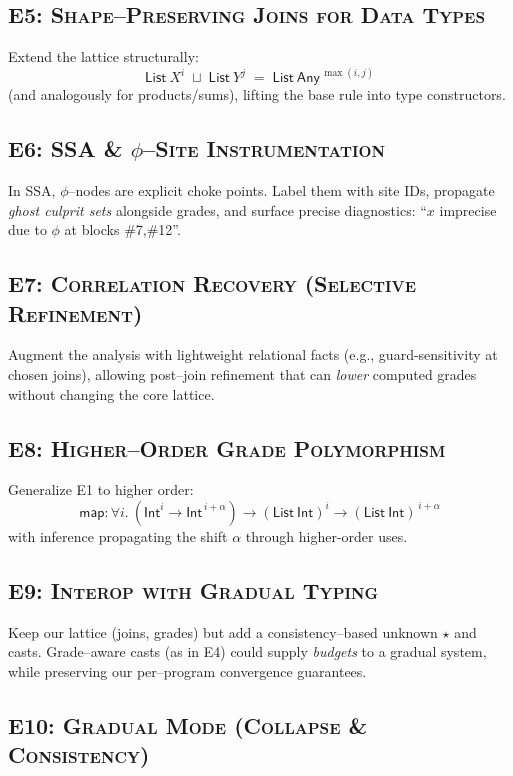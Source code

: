 \subsection{\textsc{E5: Shape–Preserving Joins for Data Types}}
Extend the lattice structurally:
\[
\textsf{List}\ X^{i} \;\sqcup\; \textsf{List}\ Y^{j}
\;=\; \textsf{List}\ \textsf{Any}^{\,\max(i,j)}
\]
(and analogously for products/sums), lifting the base rule into type constructors.

\subsection{\textsc{E6: SSA \& \texorpdfstring{$\phi$}{phi}–Site Instrumentation}}
In SSA, $\phi$–nodes are explicit choke points.
Label them with site IDs, propagate \emph{ghost culprit sets} alongside grades, and surface precise diagnostics:
“$x$ imprecise due to $\phi$ at blocks \#7,\#12”.

\subsection{\textsc{E7: Correlation Recovery (Selective Refinement)}}
Augment the analysis with lightweight relational facts (e.g., guard-sensitivity at chosen joins),
allowing post–join refinement that can \emph{lower} computed grades without changing the core lattice.

\subsection{\textsc{E8: Higher–Order Grade Polymorphism}}
Generalize \textsc{E1} to higher order:
\[
\textsf{map} : \forall i.\ (\textsf{Int}^{i}\!\to\!\textsf{Int}^{\,i+\alpha}) \to
(\textsf{List}\ \textsf{Int})^{i} \to (\textsf{List}\ \textsf{Int})^{\,i+\alpha}
\]
with inference propagating the shift $\alpha$ through higher-order uses.

\subsection{\textsc{E9: Interop with Gradual Typing}}
Keep our lattice (joins, grades) but add a consistency–based unknown $\star$ and casts.
Grade–aware casts (as in \textsc{E4}) could supply \emph{budgets} to a gradual system, while preserving our per–program convergence guarantees.

\subsection{\textsc{E10: Gradual Mode (Collapse \& Consistency)}}


